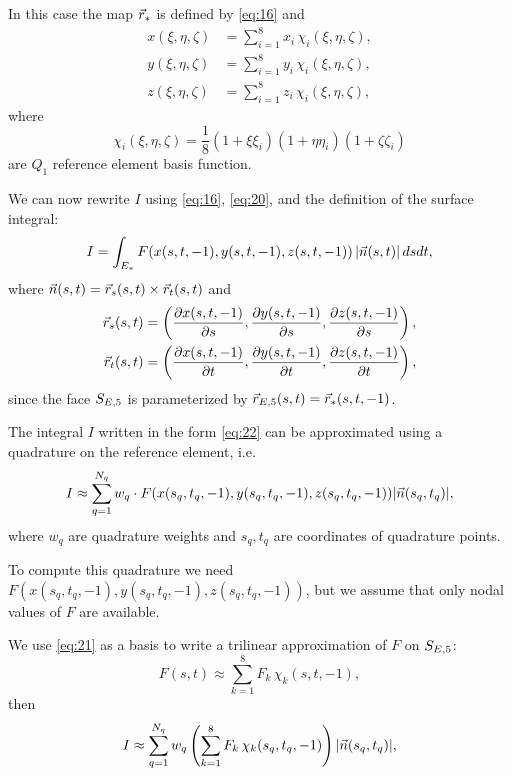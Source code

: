 \documentclass[11pt]{article}
\begin{document}
In this case the map $\vec r_{*}$ is defined by \eqref{eq:16} and
\begin{equation}
\label{eq:20}
\begin{aligned}
x(\xi,\eta,\zeta) &= \sum_{i=1}^{8} x_{i}\, \chi_{i}(\xi, \eta, \zeta),\\
y(\xi,\eta,\zeta) &= \sum_{i=1}^{8} y_{i}\, \chi_{i}(\xi, \eta, \zeta),\\
z(\xi,\eta,\zeta) &= \sum_{i=1}^{8} z_{i}\, \chi_{i}(\xi, \eta, \zeta),
\end{aligned}
\end{equation}
where
\begin{equation}
\label{eq:21}
\chi_{i}(\xi,\eta,\zeta) = \frac18 (1 + \xi\xi_{i})(1 + \eta\eta_{i})(1 + \zeta\zeta_{i})
\end{equation}
are $Q_{1}$ reference element basis function.

We can now rewrite $I$ using \eqref{eq:16}, \eqref{eq:20}, and the definition of the surface integral:
\begin{equation}
\label{eq:22}
I = \int_{E_{*}} F(x(s,t,-1), y(s,t,-1), z(s,t,-1))\, | \vec n(s,t) |\,dsdt,
\end{equation}
where $\vec n(s,t) = \vec r_{s}(s,t) \times \vec r_{t}(s,t)$ and
\begin{equation}
\label{eq:23}
\begin{aligned}
\vec r_{s}(s,t) &= \left(\frac{\partial x(s,t,-1)}{\partial s}, \frac{\partial y(s,t,-1)}{\partial s}, \frac{\partial z(s,t,-1)}{\partial s}\right),\\
\vec r_{t}(s,t) &= \left(\frac{\partial x(s,t,-1)}{\partial t}, \frac{\partial y(s,t,-1)}{\partial t}, \frac{\partial z(s,t,-1)}{\partial t}\right),
\end{aligned}
\end{equation}
since the face $S_{E,5}$ is parameterized by $\vec r_{E,5}(s, t) = \vec r_{*}(s, t, -1)$.

The integral $I$ written in the form \eqref{eq:22} can be approximated
using a quadrature on the reference element, i.e.
\begin{equation}
\label{eq:24}
I \approx \sum_{q=1}^{N_{q}} w_{q}\cdot F(x(s_{q},t_{q},-1), y(s_{q},t_{q},-1), z(s_{q},t_{q},-1)) | \vec n(s_{q},t_{q}) |,
\end{equation}
where $w_{q}$ are quadrature weights and $s_{q}, t_{q}$ are
coordinates of quadrature points.

To compute this quadrature we need
$F(x(s_{q},t_{q},-1), y(s_{q},t_{q},-1), z(s_{q},t_{q},-1))$, but we
assume that only nodal values of $F$ are available.

We use \eqref{eq:21} as a basis to write a trilinear approximation of $F$ on $S_{E,5}$:
\begin{equation}
\label{eq:25}
F(s,t) \approx \sum_{k=1}^{8} F_{k}\,\chi_{k}(s, t, -1),
\end{equation}
then
\begin{equation}
\label{eq:26}
I \approx \sum_{q=1}^{N_{q}} w_{q}\left( \sum_{k=1}^{8} F_{k}\,\chi_{k}(s_{q}, t_{q}, -1) \right) | \vec n(s_{q},t_{q}) |,
\end{equation}
\end{document}
